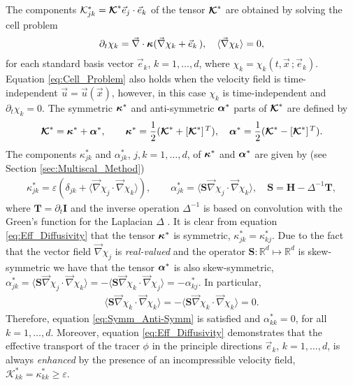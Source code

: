 \documentclass[11pt]{amsart}
\newcommand{\Tb}{\mathbf{T}}
\newcommand{\Hb}{\mathbf{H}}
\newcommand{\Ib}{\mathbf{I}}
\newcommand{\Sb}{\mathbf{S}}
\newcommand{\Kc}{\mathcal{K}}
\newcommand\Kbc{\mbox{\boldmath${\mathcal{K}}$}}
\newcommand\balpha{\mbox{\boldmath${\alpha}$}}
\newcommand\bkappa{\mbox{\boldmath${\kappa}$}}
\begin{document}
The components $\Kc^*_{jk}=\Kbc^*\vec{e}_j\cdot\vec{e}_k$ of the tensor
$\Kbc^*$ are obtained by solving the cell problem
\cite{Fannjiang:SIAM_JAM:333} 
% 
\begin{align}\label{eq:Cell_Problem}
  \partial_t\chi_k=\vec{\nabla}\cdot\bkappa(\vec{\nabla}\chi_k+\vec{e}_k\,), \quad
  \langle\vec{\nabla}\chi_k\rangle=0,
\end{align}
%
for each standard basis vector $\vec{e}_k$, $k=1,\ldots,d$, where
$\chi_k=\chi_k(t,\vec{x}\,;\vec{e}_k)$. Equation \eqref{eq:Cell_Problem}
also holds \cite{Fannjiang:SIAM_JAM:333} when the velocity field is
time-independent $\vec{u}=\vec{u}(\vec{x})$, however, in this case
$\chi_k$ is time-independent and $\partial_t\chi_k=0$. The symmetric $\bkappa^*$ and
anti-symmetric $\balpha^*$ parts of $\Kbc^*$ are defined by
%
\begin{align}\label{eq:Symm_Anti-Symm}
  \Kbc^*=\bkappa^*+\balpha^*,\qquad
  \bkappa^*=\frac{1}{2}(\Kbc^*+[\Kbc^*]^{\,T}), \quad
  \balpha^*=\frac{1}{2}(\Kbc^*-[\Kbc^*]^{\,T}).
\end{align}
%
The components $\kappa^*_{jk}$ and $\alpha^*_{jk}$, $j,k=1,\ldots,d$, of $\bkappa^*$
and $\balpha^*$ are given by (see Section \ref{sec:Multiscal_Method}) 
%
\begin{align}\label{eq:Eff_Diffusivity}
 \kappa^*_{jk}=\varepsilon(\delta_{jk}+\langle\vec{\nabla}\chi_j\cdot\vec{\nabla}\chi_k\rangle), \qquad
 \alpha^*_{jk}=\langle\Sb\vec{\nabla}\chi_j\cdot\vec{\nabla}\chi_k\rangle, \quad
 \Sb=\Hb-\Delta^{-1}\Tb,
\end{align}
%
where $\Tb=\partial_t\Ib$ and the inverse operation $\Delta^{-1}$ is based on
convolution with the Green's function for the Laplacian $\Delta$
\cite{Stakgold:BVP:2000}. It is clear from equation
\eqref{eq:Eff_Diffusivity} that the tensor $\bkappa^*$ is symmetric,
$\kappa^*_{jk}=\kappa^*_{kj}$. Due to the fact that the vector field
$\vec{\nabla}\chi_j$ is \emph{real-valued} and the operator
$\Sb:\mathbb{R}^d\mapsto\mathbb{R}^d$ is skew-symmetric we have that the
tensor $\balpha^*$ is also skew-symmetric,
$\alpha^*_{jk}=\langle\Sb\vec{\nabla}\chi_j\cdot\vec{\nabla}\chi_k\rangle=-\langle\Sb\vec{\nabla}\chi_k\cdot\vec{\nabla}\chi_j\rangle=-\alpha^*_{kj}$. In
particular,   
%
\begin{align}\label{eq:Sb_Skew}
  \langle\Sb\vec{\nabla}\chi_k\cdot\vec{\nabla}\chi_k\rangle=-\langle\Sb\vec{\nabla}\chi_k\cdot\vec{\nabla}\chi_k\rangle=0.
\end{align}
%
Therefore, equation \eqref{eq:Symm_Anti-Symm} is satisfied and
$\alpha^*_{kk}=0$, for all $k=1,\ldots,d$. Moreover, equation
\eqref{eq:Eff_Diffusivity} demonstrates that the effective transport
of the tracer $\phi$ in the principle directions $\vec{e}_k$, $k=1,\ldots,d$,
is always \emph{enhanced} by the presence of an incompressible velocity
field, $\Kc^*_{kk}=\kappa^*_{kk}\geq\varepsilon$. 
\end{document}
